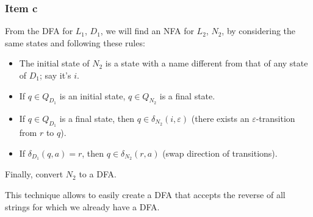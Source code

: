 {\subsubsection{Item c}
From the DFA for $L_1$, $D_1$, we will find an NFA for $L_2$, $N_2$, by considering the same states and following these rules:
\begin{itemize}
	\item The initial state of $N_2$ is a state with a name different from that of any state of $D_1$; say it's $i$.
	\item If $q \in Q_{D_1}$ is an initial state, $q \in Q_{N_2}$ is a final state.
	\item If $q \in Q_{D_1}$ is a final state, then $q \in \delta_{N_2}(i,\varepsilon)$ (there exists an $\varepsilon$-transition from $r$ to $q$).
	\item If $\delta_{D_1}(q,a)=r$, then $q \in \delta_{N_2}(r,a)$ (swap direction of transitions).
\end{itemize}
Finally, convert $N_2$ to a DFA.\par
This technique allows to easily create a DFA that accepts the reverse of all strings for which we already have a DFA.
}
